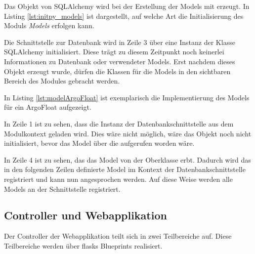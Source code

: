 Das Objekt von SQLAlchemy wird bei der Erstellung der Models mit erzeugt.
In Listing \ref{lst:initpy_models} ist dargestellt, auf welche Art die Initialisierung des Moduls \textit{Models} erfolgen kann. 

    
Die Schnittstelle zur Datenbank wird in Zeile 3 über eine Instanz der Klasse SQLAlchemy initialisiert. Diese trägt zu diesem Zeitpunkt noch keinerlei Informationen zu Datenbank oder verwendeter Models.
Erst nachdem dieses Objekt erzeugt wurde, dürfen die Klassen für die Models in den sichtbaren Bereich des Modules gebracht werden. 

In Listing \ref{lst:modelArgoFloat} ist exemplarisch die Implementierung des Models für ein ArgoFloat aufgezeigt.

    
In Zeile 1 ist zu sehen, dass die Instanz der Datenbankschnittstelle aus dem Modulkontext geladen wird. Dies wäre nicht möglich, wäre das Objekt noch nicht initialisiert, bevor das Model über die  aufgerufen worden wäre. 

In Zeile 4 ist zu sehen, das das Model von der Oberklasse  erbt. Dadurch wird das in den folgenden Zeilen definierte Model im Kontext der Datenbankschnittstelle registriert und kann nun angesprochen werden. Auf diese Weise werden alle Models an der Schnittstelle registriert. 




\subsection{Controller und Webapplikation}

Der Controller der Webapplikation teilt sich in zwei Teilbereiche auf.
Diese Teilbereiche werden über flasks Blueprints realisiert.

